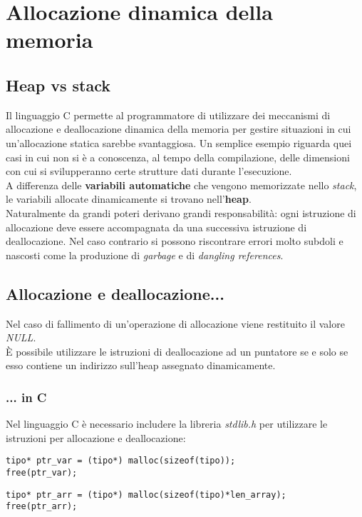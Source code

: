 \chapter{Allocazione dinamica della memoria}\label{memoriaDin}
\section{Heap vs stack}
Il linguaggio C permette al programmatore di utilizzare dei meccanismi di allocazione e deallocazione dinamica della memoria per gestire situazioni in cui un’allocazione statica sarebbe svantaggiosa. Un semplice esempio riguarda quei casi in cui non si è a conoscenza, al tempo della compilazione, delle dimensioni con cui si svilupperanno certe strutture dati durante l'esecuzione.\\
A differenza delle \textbf{variabili automatiche} che vengono memorizzate nello \textit{stack}, le variabili allocate dinamicamente si trovano nell'\textbf{heap}.\\
Naturalmente da grandi poteri derivano grandi responsabilità: ogni istruzione di allocazione deve essere accompagnata da una successiva istruzione di deallocazione. Nel caso contrario si possono riscontrare errori molto subdoli e nascosti come la produzione di \textit{garbage} e di \textit{dangling references}.

\section{Allocazione e deallocazione...}
Nel caso di fallimento di un'operazione di allocazione viene restituito il valore \textit{NULL}.\\
\`{E} possibile utilizzare le istruzioni di deallocazione ad un puntatore se e solo se esso contiene un indirizzo sull'heap assegnato dinamicamente.
\subsection{... in C}
Nel linguaggio C è necessario includere la libreria \textit{stdlib.h} per utilizzare le istruzioni per allocazione e deallocazione:
\begin{lstlisting}[title={Allocazione e deallocazione dinamica di una variabile in C}]
tipo* ptr_var = (tipo*) malloc(sizeof(tipo));
free(ptr_var);
\end{lstlisting}
\begin{lstlisting}[title={Allocazione e deallocazione dinamica di un vettore in C}]
tipo* ptr_arr = (tipo*) malloc(sizeof(tipo)*len_array);
free(ptr_arr);
\end{lstlisting}


